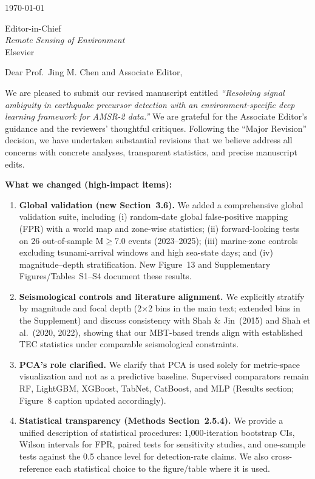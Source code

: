 \documentclass[12pt]{article}
\begin{document}
\pagestyle{empty}

\begin{flushright}
\today
\end{flushright}

\bigskip

Editor-in-Chief\\
\textit{Remote Sensing of Environment}\\
Elsevier

\bigskip

Dear Prof.~Jing M. Chen and Associate Editor,

We are pleased to submit our revised manuscript entitled \textit{``Resolving signal ambiguity in earthquake precursor detection with an environment-specific deep learning framework for AMSR-2 data.''} We are grateful for the Associate Editor’s guidance and the reviewers’ thoughtful critiques. Following the ``Major Revision'' decision, we have undertaken substantial revisions that we believe address all concerns with concrete analyses, transparent statistics, and precise manuscript edits.

\medskip

\noindent\textbf{What we changed (high-impact items):}

\begin{enumerate}
\item \textbf{Global validation (new Section~3.6).} We added a comprehensive global validation suite, including (i) random-date global false-positive mapping (FPR) with a world map and zone-wise statistics; (ii) forward-looking tests on 26 out-of-sample M$\ge$7.0 events (2023--2025); (iii) marine-zone controls excluding tsunami-arrival windows and high sea-state days; and (iv) magnitude--depth stratification. New Figure~13 and Supplementary Figures/Tables~S1--S4 document these results.
\item \textbf{Seismological controls and literature alignment.} We explicitly stratify by magnitude and focal depth (2$\times$2 bins in the main text; extended bins in the Supplement) and discuss consistency with Shah \& Jin~(2015) and Shah et al.~(2020, 2022), showing that our MBT-based trends align with established TEC statistics under comparable seismological constraints.
\item \textbf{PCA’s role clarified.} We clarify that PCA is used solely for metric-space visualization and not as a predictive baseline. Supervised comparators remain RF, LightGBM, XGBoost, TabNet, CatBoost, and MLP (Results section; Figure~8 caption updated accordingly).
\item \textbf{Statistical transparency (Methods Section~2.5.4).} We provide a unified description of statistical procedures: 1,000-iteration bootstrap CIs, Wilson intervals for FPR, paired tests for sensitivity studies, and one-sample tests against the 0.5 chance level for detection-rate claims. We also cross-reference each statistical choice to the figure/table where it is used.
\end{enumerate}
\end{document}
